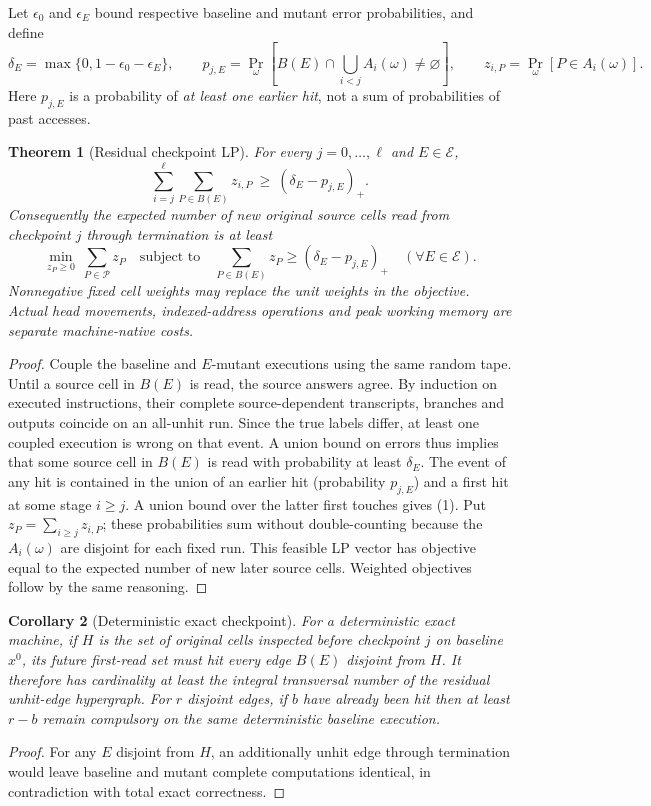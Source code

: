 \documentclass[11pt]{article}
\newtheorem{theorem}{Theorem}
\newtheorem{corollary}[theorem]{Corollary}
\begin{document}
Let $\epsilon_0$ and $\epsilon_E$ bound respective baseline and
mutant error probabilities, and define
\[
\delta_E=\max\{0,1-\epsilon_0-\epsilon_E\},\qquad
p_{j,E}=\Pr_\omega[B(E)\cap\textstyle\bigcup_{i<j}A_i(\omega)
\ne\varnothing],\qquad
z_{i,P}=\Pr_\omega[P\in A_i(\omega)].
\]
Here $p_{j,E}$ is a probability of \emph{at least one earlier hit}, not
a sum of probabilities of past accesses.

\begin{theorem}[Residual checkpoint LP]\label{th:res}
For every $j=0,\ldots,\ell$ and $E\in\mathcal E$,
\[
\boxed{\sum_{i=j}^{\ell}\sum_{P\in B(E)} z_{i,P}
\ \ge\ (\delta_E-p_{j,E})_+.}\tag{1}
\]
Consequently the expected number of \emph{new} original source cells
read from checkpoint $j$ through termination is at least
\[
\boxed{\min_{z_P\ge0}\ \sum_{P\in\mathcal P}z_P
\quad\text{subject to}\quad
\sum_{P\in B(E)}z_P\ge(\delta_E-p_{j,E})_+
\quad(\forall E\in\mathcal E).}\tag{2}
\]
Nonnegative fixed cell weights may replace the unit weights in the
objective. Actual head movements, indexed-address operations and peak
working memory are separate machine-native costs.
\end{theorem}
\begin{proof}
Couple the baseline and $E$-mutant executions using the same random tape.
Until a source cell in $B(E)$ is read, the source answers agree. By
induction on executed instructions, their complete source-dependent
transcripts, branches and outputs coincide on an all-unhit run.
Since the true labels differ, at least one coupled execution is wrong
on that event. A union bound on errors thus implies that some source
cell in $B(E)$ is read with probability at least $\delta_E$.
The event of any hit is contained in the union of an earlier hit
(probability $p_{j,E}$) and a first hit at some stage $i\ge j$.
A union bound over the latter first touches gives (1).
Put $z_P=\sum_{i\ge j}z_{i,P}$; these probabilities sum without
double-counting because the $A_i(\omega)$ are disjoint for each
fixed run. This feasible LP vector has objective equal to the
expected number of new later source cells. Weighted objectives
follow by the same reasoning.
\end{proof}

\begin{corollary}[Deterministic exact checkpoint]\label{co:det}
For a deterministic exact machine, if $H$ is the set of original cells
inspected before checkpoint $j$ on baseline $x^0$, its future first-read
set must hit every edge $B(E)$ disjoint from $H$. It therefore has
cardinality at least the \emph{integral} transversal number of the
residual unhit-edge hypergraph. For $r$ disjoint edges, if $b$ have
already been hit then at least $r-b$ remain compulsory on the
\emph{same} deterministic baseline execution.
\end{corollary}
\begin{proof}
For any $E$ disjoint from $H$, an additionally unhit edge through
termination would leave baseline and mutant complete computations
identical, in contradiction with total exact correctness.
\end{proof}
\end{document}
